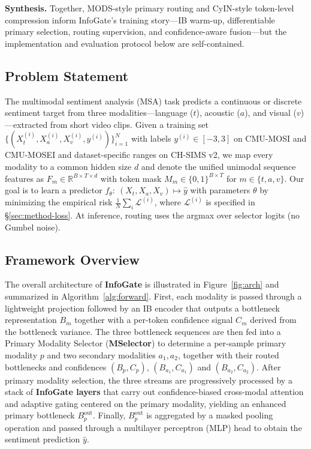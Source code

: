 \documentclass[11pt]{article}
\begin{document}
\textbf{Synthesis.}
Together, MODS-style primary routing and CyIN-style token-level compression
inform InfoGate's training story---IB warm-up, differentiable primary selection,
routing supervision, and confidence-aware fusion---but the implementation and
evaluation protocol below are self-contained.

\subsection{Problem Statement}
\label{sec:method-prob}
The multimodal sentiment analysis (MSA) task predicts a continuous or discrete
sentiment target from three modalities---language ($t$), acoustic ($a$), and
visual ($v$)---extracted from short video clips.
Given a training set $\{(X^{(i)}_t,X^{(i)}_a,X^{(i)}_v,y^{(i)})\}_{i=1}^{N}$
with labels $y^{(i)}\in[-3,3]$ on CMU-MOSI and CMU-MOSEI and dataset-specific
ranges on CH-SIMS v2, we map every modality to a common hidden size $d$ and
denote the unified unimodal sequence features as
$F_m \in \mathbb{R}^{B \times T \times d}$ with token mask
$M_m \in \{0,1\}^{B \times T}$ for $m \in \{t, a, v\}$.
Our goal is to learn a predictor
$f_{\theta}:\ (X_t, X_a, X_v) \mapsto \hat{y}$ with parameters $\theta$ by
minimizing the empirical risk $\tfrac{1}{N}\sum_i \mathcal{L}^{(i)}$, where
$\mathcal{L}^{(i)}$ is specified in \S\ref{sec:method-loss}.
At inference, routing uses the argmax over selector logits (no Gumbel noise).

\subsection{Framework Overview}
\label{sec:method-overview}
The overall architecture of \textbf{InfoGate} is illustrated in
Figure~\ref{fig:arch} and summarized in Algorithm~\ref{alg:forward}.
First, each modality is passed through a lightweight projection followed by
an IB encoder that outputs a bottleneck representation $B_m$ together with a
per-token confidence signal $C_m$ derived from the bottleneck variance.
The three bottleneck sequences are then fed into a Primary Modality Selector
(\textbf{MSelector}) to determine a per-sample primary modality $p$ and two
secondary modalities $a_1,a_2$, together with their routed bottlenecks and
confidences $(B_p, C_p)$, $(B_{a_1}, C_{a_1})$ and $(B_{a_2}, C_{a_2})$.
After primary modality selection, the three streams are progressively processed
by a stack of \textbf{InfoGate layers} that carry out confidence-biased
cross-modal attention and adaptive gating centered on the primary modality,
yielding an enhanced primary bottleneck $B_p^{\mathrm{out}}$.
Finally, $B_p^{\mathrm{out}}$ is aggregated by a masked pooling operation and
passed through a multilayer perceptron (MLP) head to obtain the sentiment
prediction $\hat{y}$.
\end{document}
